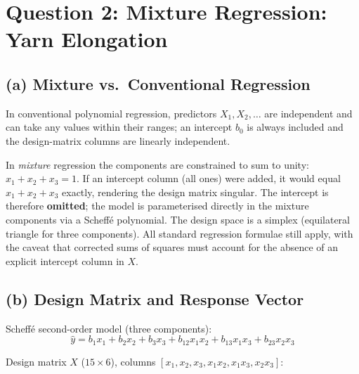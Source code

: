 \documentclass[12pt,a4paper]{article}
\begin{document}
\clearpage
\section{Question 2: Mixture Regression: Yarn Elongation}

\subsection{(a) Mixture vs.\ Conventional Regression}

In conventional polynomial regression, predictors $X_1, X_2, \ldots$ are independent
and can take any values within their ranges; an intercept $b_0$ is always included and
the design-matrix columns are linearly independent.

In \emph{mixture} regression the components are constrained to sum to unity:
$x_1 + x_2 + x_3 = 1$. If an intercept column (all ones) were added, it would equal
$x_1 + x_2 + x_3$ exactly, rendering the design matrix singular. The intercept is
therefore \textbf{omitted}; the model is parameterised directly in the mixture
components via a Scheff\'{e} polynomial. The design space is a simplex (equilateral
triangle for three components). All standard regression formulae still apply, with the
caveat that corrected sums of squares must account for the absence of an explicit
intercept column in $X$.

\subsection{(b) Design Matrix and Response Vector}

Scheff\'{e} second-order model (three components):
\[
  \hat{y} = b_1 x_1 + b_2 x_2 + b_3 x_3
           + b_{12}x_1 x_2 + b_{13}x_1 x_3 + b_{23}x_2 x_3
\]

Design matrix $X$ ($15 \times 6$), columns $[x_1, x_2, x_3, x_1 x_2, x_1 x_3, x_2 x_3]$:
\end{document}
